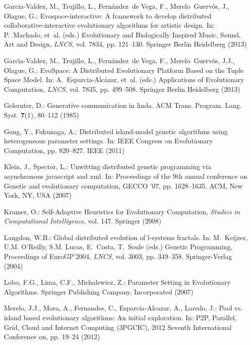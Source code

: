 \begin{thebibliography}{10}
Garcia-Valdez, M., Trujillo, L., Fern{\'a}ndez~de Vega, F., Merelo~Guerv{\'o}s,
  J., Olague, G.: Evospace-interactive: A framework to develop distributed
  collaborative-interactive evolutionary algorithms for artistic design.
\newblock In: P.~Machado, et~al. (eds.) Evolutionary and Biologically Inspired
  Music, Sound, Art and Design, \emph{LNCS}, vol. 7834, pp. 121--130. Springer
  Berlin Heidelberg (2013)

Garc{\'\i}a-Valdez, M., Trujillo, L., Fern{\'a}ndez~de Vega, F.,
  Merelo~Guerv\'os, J.J., Olague, G.: {EvoSpace: A Distributed Evolutionary
  Platform Based on the Tuple Space Model}.
\newblock In: A.~Esparcia-Alc{\'a}zar, et~al. (eds.) Applications of
  Evolutionary Computation, \emph{LNCS}, vol. 7835, pp. 499--508. Springer
  Berlin Heidelberg (2013)

Gelernter, D.: Generative communication in linda.
\newblock ACM Trans. Program. Lang. Syst. \textbf{7}(1), 80--112 (1985)

Gong, Y., Fukunaga, A.: Distributed island-model genetic algorithms using
  heterogeneous parameter settings.
\newblock In: IEEE Congress on Evolutionary Computation, pp. 820--827. IEEE
  (2011)

Klein, J., Spector, L.: Unwitting distributed genetic programming via
  asynchronous javascript and xml.
\newblock In: Proceedings of the 9th annual conference on Genetic and
  evolutionary computation, GECCO '07, pp. 1628--1635. ACM, New York, NY, USA
  (2007)

Kramer, O.: Self-Adaptive Heuristics for Evolutionary Computation,
  \emph{Studies in Computational Intelligence}, vol. 147.
\newblock Springer (2008)

Langdon, W.B.: Global distributed evolution of l-systems fractals.
\newblock In: M.~Keijzer, U.M. O'Reilly, S.M. Lucas, E.~Costa, T.~Soule (eds.)
  Genetic Programming, Proceedings of EuroGP'2004, \emph{LNCS}, vol. 3003, pp.
  349--358. Springer-Verlag (2004)

Lobo, F.G., Lima, C.F., Michalewicz, Z.: Parameter Setting in Evolutionary
  Algorithms.
\newblock Springer Publishing Company, Incorporated (2007)

Merelo, J.J., Mora, A., Fernandes, C., Esparcia-Alcazar, A., Laredo, J.: Pool
  vs. island based evolutionary algorithms: An initial exploration.
\newblock In: P2P, Parallel, Grid, Cloud and Internet Computing (3PGCIC), 2012
  Seventh International Conference on, pp. 19--24 (2012)


\end{thebibliography}
